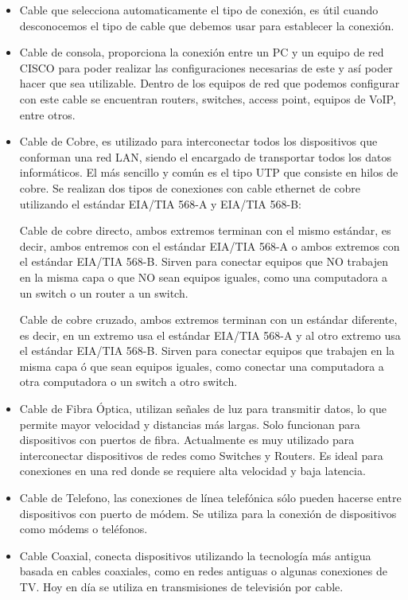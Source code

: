 \documentclass{article}
\begin{document}
\begin{itemize}
    \item Cable que selecciona automaticamente el tipo de conexión, es útil cuando desconocemos el tipo de cable que debemos usar para establecer la conexión. 
    \item Cable de consola,  proporciona la conexión entre un PC y un equipo de red CISCO para poder realizar las configuraciones necesarias de este y así poder hacer que sea utilizable. Dentro de los equipos de red que podemos configurar con este cable se encuentran routers, switches, access point, equipos de VoIP, entre otros.
    \item Cable de Cobre, es utilizado para interconectar todos los dispositivos que conforman una red LAN, siendo el encargado de transportar todos los datos informáticos. El más sencillo y común es el tipo UTP que consiste en hilos de cobre. Se realizan dos tipos de conexiones con cable ethernet de cobre utilizando el estándar EIA/TIA 568-A y EIA/TIA 568-B: 

        Cable de cobre directo, ambos extremos terminan con el mismo estándar, es decir, ambos entremos con el estándar EIA/TIA 568-A o ambos extremos con el estándar EIA/TIA 568-B. Sirven para conectar equipos que NO trabajen en la misma capa o que NO sean equipos iguales, como una computadora a un switch o un router a un switch.

        Cable de cobre cruzado, ambos extremos terminan con un estándar diferente, es decir, en un extremo usa el estándar EIA/TIA 568-A y al otro extremo usa el estándar EIA/TIA 568-B. Sirven para conectar equipos que trabajen en la misma capa ó que sean equipos iguales, como conectar una computadora a otra computadora o un switch a otro switch.

    \item Cable de Fibra Óptica, utilizan señales de luz para transmitir datos, lo que permite mayor velocidad y distancias más largas. Solo funcionan para dispositivos con puertos de fibra. Actualmente es muy utilizado para interconectar dispositivos de redes como Switches y Routers. Es ideal para conexiones en una red donde se requiere alta velocidad y baja latencia.

    \item Cable de Telefono, las conexiones de línea telefónica sólo pueden hacerse entre dispositivos con puerto de módem. Se utiliza para la conexión de dispositivos como módems o teléfonos.

    \item Cable Coaxial, conecta dispositivos utilizando la tecnología más antigua basada en cables coaxiales, como en redes antiguas o algunas conexiones de TV. Hoy en día se utiliza en transmisiones de televisión por cable.


\end{itemize}
\end{document}
